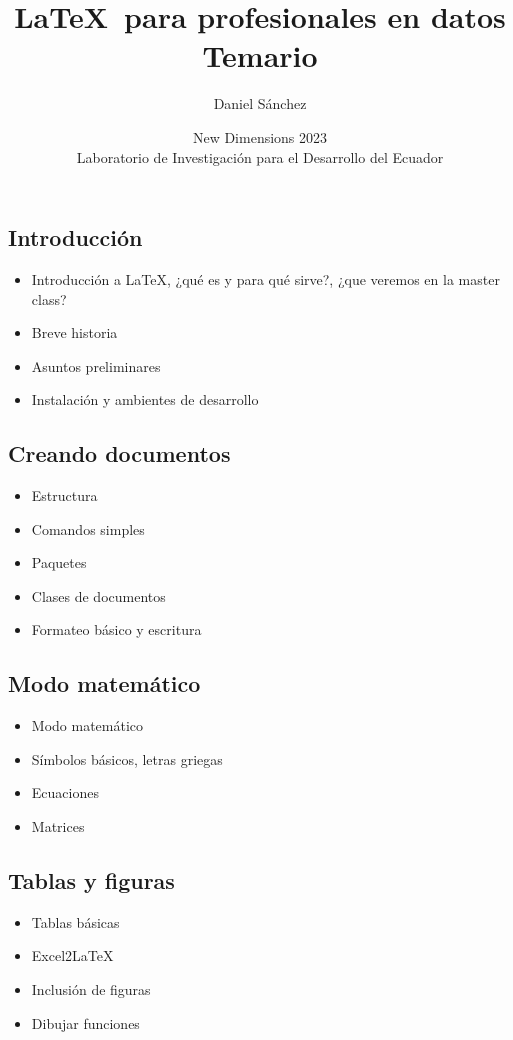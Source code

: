 \documentclass[12pt]{article}
\title{\LaTeX \ para profesionales en datos \\[1em] \Large Temario}
\author{Daniel Sánchez}
\date{New Dimensions 2023 \\[1em] Laboratorio de Investigación para el Desarrollo del Ecuador}
\begin{document}
\maketitle

\subsection*{Introducción}

\begin{itemize}
    \item Introducción a \LaTeX, ¿qué es y para qué sirve?, ¿que veremos en la master class? 
    \item Breve historia
    \item Asuntos preliminares
    \item Instalación y ambientes de desarrollo
\end{itemize}

\subsection*{Creando documentos}

\begin{itemize}
    \item Estructura
    \item Comandos simples
    \item Paquetes 
    \item Clases de documentos
    \item Formateo básico y escritura
\end{itemize}

\subsection*{Modo matemático}

\begin{itemize}
    \item Modo matemático
    \item Símbolos básicos, letras griegas
    \item Ecuaciones
    \item Matrices
\end{itemize}

\subsection*{Tablas y figuras}

\begin{itemize}
    \item Tablas básicas
    \item Excel2LaTeX
    \item Inclusión de figuras
    \item Dibujar funciones
\end{itemize}
\end{document}
